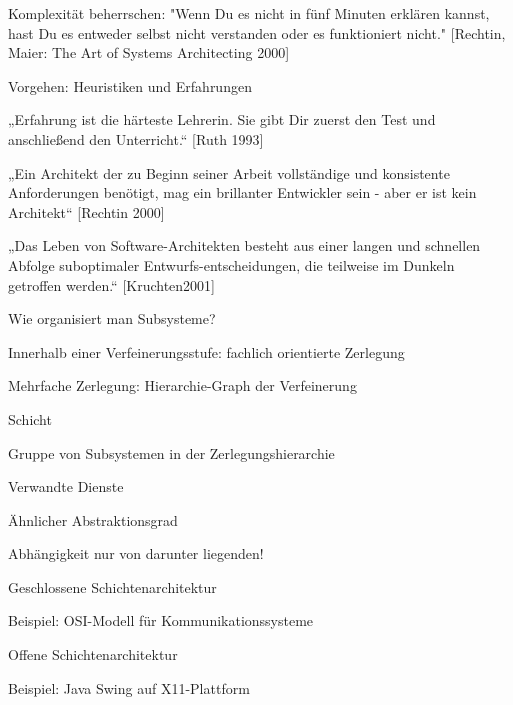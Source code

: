\documentclass[a4paper]{article}
\begin{document}
\begin{multicols}{3}
  Komplexität beherrschen: "Wenn Du es nicht in fünf Minuten erklären kannst, hast Du es entweder selbst nicht verstanden oder es funktioniert nicht." [Rechtin, Maier: The Art of Systems Architecting 2000]

  Vorgehen: Heuristiken und Erfahrungen
  \begin{itemize*}
    \item „Erfahrung ist die härteste Lehrerin. Sie gibt Dir zuerst den Test und anschließend den Unterricht.“ [Ruth 1993]
    \item „Ein Architekt der zu Beginn seiner Arbeit vollständige und konsistente Anforderungen benötigt, mag ein brillanter Entwickler sein - aber er ist kein Architekt“ [Rechtin 2000]
    \item „Das Leben von Software-Architekten besteht aus einer langen und schnellen Abfolge suboptimaler Entwurfs-entscheidungen, die teilweise im Dunkeln getroffen werden.“ [Kruchten2001]
  \end{itemize*}

  Wie organisiert man Subsysteme?
  \begin{itemize*}
    \item Innerhalb einer Verfeinerungsstufe: fachlich orientierte Zerlegung
    \item Mehrfache Zerlegung: Hierarchie-Graph der Verfeinerung
  \end{itemize*}

  Schicht
  \begin{itemize*}
    \item Gruppe von Subsystemen in der Zerlegungshierarchie
    \item Verwandte Dienste
    \item Ähnlicher Abstraktionsgrad
    \item Abhängigkeit nur von darunter liegenden!
  \end{itemize*}

  \begin{itemize*}
    \item Geschlossene Schichtenarchitektur
    \begin{itemize*}
      \item Beispiel: OSI-Modell für Kommunikationssysteme
    \end{itemize*}
    \item Offene Schichtenarchitektur
    \begin{itemize*}
      \item Beispiel: Java Swing auf X11-Plattform
    \end{itemize*}
  \end{itemize*}


\end{multicols}
\end{document}
